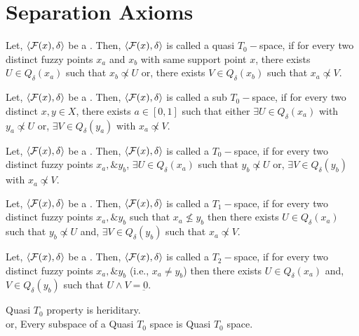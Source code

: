 \documentclass[../main-sheet.tex]{subfiles}
\begin{document}
\chapter{Separation Axioms}
\begin{defn}
    Let, \(\langle \mathcal{F}(x), \delta \rangle\) be a \fts. Then, \(\langle \mathcal{F}(x), \delta \rangle\) is called a quasi \(T_0-\)space, if for every two distinct fuzzy points \(x_a\) and \(x_b\) with same support point \(x\), there exists \(U\in Q_\delta(x_a)\) such that \(x_b \not\propto U\) or, there exists \(V\in Q_\delta(x_b)\) such that \(x_a \not\propto V\).
\end{defn}
\begin{defn}
    Let, \(\langle \mathcal{F}(x), \delta \rangle\) be a \fts. Then, \(\langle \mathcal{F}(x), \delta \rangle\) is called a sub \(T_0-\)space, if for every two distinct \(x, y \in X\), there exists \(a\in [0,1]\) such that either \(\exists U\in Q_\delta(x_a)\) with \(y_a \not\propto U\) or, \(\exists V\in Q_\delta(y_a)\) with \(x_a \not\propto V\).
\end{defn}
\begin{defn}[\(T_0-\)space]
    Let, \(\langle \mathcal{F}(x), \delta \rangle\) be a \fts. Then, \(\langle \mathcal{F}(x), \delta \rangle\) is called a \(T_0-\)space, if for every two distinct fuzzy points \(x_a,\& y_b\),  \(\exists U\in Q_\delta(x_a)\) such that \(y_b \not\propto U\) or, \(\exists V\in Q_\delta(y_b)\) with \(x_a \not\propto V\).
\end{defn}
\begin{defn}[\(T_1-\)space]
    Let, \(\langle \mathcal{F}(x), \delta \rangle\) be a \fts. Then, \(\langle \mathcal{F}(x), \delta \rangle\) is called a \(T_1-\)space, if for every two distinct fuzzy points \(x_a,\& y_b\) such that \(x_a\not\leq y_b\) then there exists \(U\in Q_\delta(x_a)\) such that \(y_b \not\propto U\) and, \(\exists V\in Q_\delta(y_b)\) such that \(x_a \not\propto V\).
\end{defn}
\begin{defn}[\(T_2-\)space]
    Let, \(\langle \mathcal{F}(x), \delta \rangle\) be a \fts. Then, \(\langle \mathcal{F}(x), \delta \rangle\) is called a \(T_2-\)space, if for every two distinct fuzzy points \(x_a,\& y_b\) (i.e., \(x_a\neq y_b\)) then there exists \(U\in Q_\delta(x_a)\) and, \(V\in Q_\delta(y_b)\) such that \(U\wedge V=\underbar{0}\).
\end{defn}
\begin{thm}
    Quasi \(T_0\) property is heriditary.\\
    or, Every subspace of a Quasi \(T_0\) space is Quasi \(T_0\) space.
\end{thm}
\end{document}
